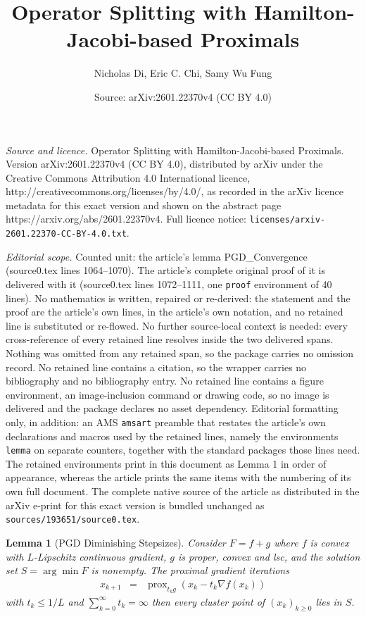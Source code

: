 \documentclass[10pt,a4paper]{amsart}
\title{Operator Splitting with Hamilton-Jacobi-based Proximals}
\author{Nicholas Di, Eric C. Chi, Samy Wu Fung}
\date{Source: arXiv:2601.22370v4 (CC BY 4.0)}
\newtheorem{lemma}{Lemma}
\newcommand{\prox}{\operatorname{prox}}
\begin{document}
\maketitle

\noindent\emph{Source and licence.} Operator Splitting with Hamilton-Jacobi-based Proximals. Version arXiv:2601.22370v4 (CC BY 4.0), distributed by arXiv under the Creative Commons Attribution 4.0 International licence, http://creativecommons.org/licenses/by/4.0/, as recorded in the arXiv licence metadata for this exact version and shown on the abstract page https://arxiv.org/abs/2601.22370v4. Full licence notice: \texttt{licenses/arxiv-2601.22370-CC-BY-4.0.txt}.\par\smallskip

\noindent\textit{Editorial scope.} Counted unit: the article's lemma PGD\_Convergence (source0.tex lines 1064--1070). The article's complete original proof of it is delivered with it (source0.tex lines 1072--1111, one \texttt{proof} environment of 40 lines). No mathematics is written, repaired or re-derived: the statement and the proof are the article's own lines, in the article's own notation, and no retained line is substituted or re-flowed.  No further source-local context is needed: every cross-reference of every retained line resolves inside the two delivered spans.  Nothing was omitted from any retained span, so the package carries no omission record.  No retained line contains a citation, so the wrapper carries no bibliography and no bibliography entry.  No retained line contains a figure environment, an image-inclusion command or drawing code, so no image is delivered and the package declares no asset dependency.  Editorial formatting only, in addition: an AMS \texttt{amsart} preamble that restates the article's own declarations and macros used by the retained lines, namely the environments \texttt{lemma} on separate counters, together with the standard packages those lines need.  The retained environments print in this document as Lemma 1 in order of appearance, whereas the article prints the same items with the numbering of its own full document.  The complete native source of the article as distributed in the arXiv e-print for this exact version is bundled unchanged as \texttt{sources/193651/source0.tex}.
\begin{lemma}[PGD Diminishing Stepsizes]\label{lem: PGD_Convergence}
Consider $F = f+ g$ where $f$ is convex with $L$-Lipschitz continuous gradient, $g$ is proper, convex and lsc, and the solution set $S = \arg\min F$ is nonempty. The proximal gradient iterations
\begin{eqnarray}
    x_{k+1} &=& \prox_{t_k g}(x_k - t_k \nabla f(x_k))
\end{eqnarray}
with $t_k \leq 1/L$ and $\sum_{k=0}^{\infty} t_k = \infty$ then every cluster point of $(x_k)_{k \geq 0}$ lies in $S$.
\end{lemma}
\end{document}
